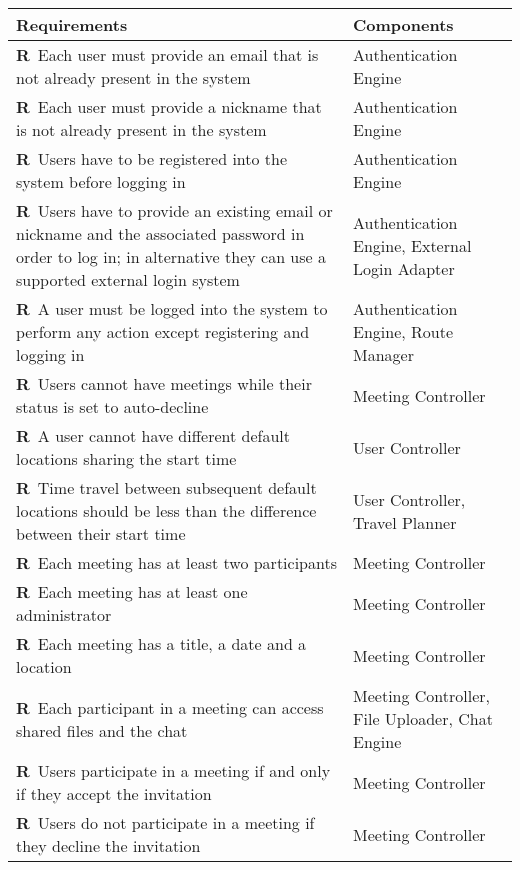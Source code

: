 \newcommand{\reqNum}{\stepcounter{countReq}\thecountReq}

\def\arraystretch{1.5}
\begin{longtable}{|m{7cm}|m{7cm}|}
	\hline
	\textbf{Requirements}            & 		\textbf{Components}		    \\ \hline
	\textbf{R\reqNum}~Each user must provide an email that is not already present in the system & Authentication Engine	\\ \hline
	\textbf{R\reqNum}~Each user must provide a nickname that is not already present in the system & Authentication Engine	\\ \hline
	\textbf{R\reqNum}~Users have to be registered into the system before logging in & Authentication Engine	\\ \hline
	\textbf{R\reqNum}~Users have to provide an existing email or nickname and the associated password in order to log in; in alternative they can use a supported external login system & Authentication Engine, External Login Adapter	\\ \hline
	\textbf{R\reqNum}~A user must be logged into the system to perform any action except registering and logging in & Authentication Engine, Route Manager	\\ \hline
	\textbf{R\reqNum}~Users cannot have meetings while their status is set to auto-decline & Meeting Controller	\\ \hline
	\textbf{R\reqNum}~A user cannot have different default locations sharing the start time & User Controller	\\ \hline
	\textbf{R\reqNum}~Time travel between subsequent default locations should be less than the difference between their start time & User Controller, Travel Planner	\\ \hline
	\textbf{R\reqNum}~Each meeting has at least two participants & Meeting Controller	\\ \hline
	\textbf{R\reqNum}~Each meeting has at least one administrator & Meeting Controller	\\ \hline
	\textbf{R\reqNum}~Each meeting has a title, a date and a location & Meeting Controller	\\ \hline
	\textbf{R\reqNum}~Each participant in a meeting can access shared files and the chat & Meeting Controller, File Uploader, Chat Engine	\\ \hline
	\textbf{R\reqNum}~Users participate in a meeting if and only if they accept the invitation & Meeting Controller	\\ \hline
	\textbf{R\reqNum}~Users do not participate in a meeting if they decline the invitation & Meeting Controller	\\ \hline

\end{longtable}
